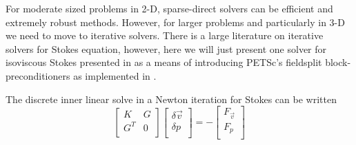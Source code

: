 For moderate sized problems in 2-D, sparse-direct solvers can be
efficient and extremely robust methods.  However, for larger problems
and particularly in 3-D we need to move to iterative solvers.  There
is a large literature on iterative solvers for Stokes equation, 
however, here we will just present one solver for isoviscous
Stokes presented in \cite{elman_finite_2005} as a means of introducing
PETSc's fieldsplit block-preconditioners as implemented in \TF{}.

The discrete inner linear solve in a Newton iteration for Stokes can
be written
\begin{equation}
  \label{eq:21}
     \left[
\begin{array}{cc}
  K & G  \\
  G^{T} & 0 \\
  \end{array}
  \right]
  \left[
    \begin{array}{c}
      \delta \vec{v} \\
      \delta p \\
    \end{array}
  \right] = -\left[
    \begin{array}{c}
      F_{\vec{v}} \\
      F_{p}\\
    \end{array}
  \right]
\end{equation}

